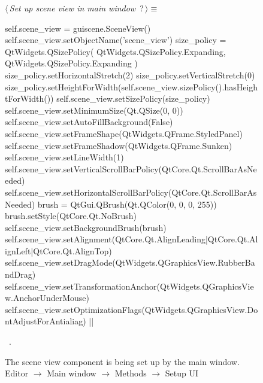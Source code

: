 \documentclass[%
    a4paper,    %
    justified,  %
    nobib,      %
    openany     %
]{tufte-book}
\begin{document}
\begin{figure}
\begin{flushleft} \small
\begin{minipage}{\linewidth}\label{scrap83}\raggedright\small
{} $\langle\,${\itshape Set up scene view in main window}\nobreak\ {\footnotesize {?}}$\,\rangle\equiv$
\vspace{-1ex}
\begin{pythoncode}
self.scene_view = guiscene.SceneView()
self.scene_view.setObjectName('scene_view')
size_policy = QtWidgets.QSizePolicy(
    QtWidgets.QSizePolicy.Expanding,
    QtWidgets.QSizePolicy.Expanding
)
size_policy.setHorizontalStretch(2)
size_policy.setVerticalStretch(0)
size_policy.setHeightForWidth(self.scene_view.sizePolicy().hasHeightForWidth())
self.scene_view.setSizePolicy(size_policy)
self.scene_view.setMinimumSize(Qt.QSize(0, 0))
self.scene_view.setAutoFillBackground(False)
self.scene_view.setFrameShape(QtWidgets.QFrame.StyledPanel)
self.scene_view.setFrameShadow(QtWidgets.QFrame.Sunken)
self.scene_view.setLineWidth(1)
self.scene_view.setVerticalScrollBarPolicy(QtCore.Qt.ScrollBarAsNeeded)
self.scene_view.setHorizontalScrollBarPolicy(QtCore.Qt.ScrollBarAsNeeded)
brush = QtGui.QBrush(Qt.QColor(0, 0, 0, 255))
brush.setStyle(QtCore.Qt.NoBrush)
self.scene_view.setBackgroundBrush(brush)
self.scene_view.setAlignment(QtCore.Qt.AlignLeading|QtCore.Qt.AlignLeft|QtCore.Qt.AlignTop)
self.scene_view.setDragMode(QtWidgets.QGraphicsView.RubberBandDrag)
self.scene_view.setTransformationAnchor(QtWidgets.QGraphicsView.AnchorUnderMouse)
self.scene_view.setOptimizationFlags(QtWidgets.QGraphicsView.DontAdjustForAntialiag)
|\NWsep|
\end{pythoncode}
\vspace{1.5ex}
\footnotesize
\begin{list}{}{\setlength{\itemsep}{-\parsep}\setlength{\itemindent}{-\leftmargin}}
\item \NWtxtMacroRefIn\ .

\item{}
\end{list}
\end{minipage}\vspace{4ex}
\end{flushleft}
\caption{The scene view component is being set up by the main window.
  \newline{}\newline{}Editor $\rightarrow$ Main window $\rightarrow$
  Methods $\rightarrow$ Setup UI}
\label{editor:lst:main-window:methods:setup-ui:setup-scene-view}
\end{figure}
\end{document}
